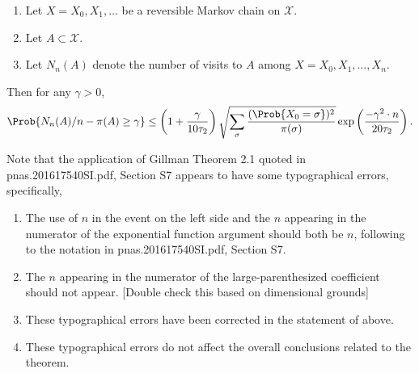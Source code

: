 \documentclass[12pt]{article}
\begin{document}
\begin{theorem}%
    \label{thm:significance:gillman}
    \begin{enumerate}
        \item
            Let \( X = X_0, X_1, \dots \) be a reversible Markov chain
            on \( \mathcal{X} \).
        \item
            Let \( A \subset \mathcal{X} \).
        \item
            Let \( N_n(A) \) denote the number of visits to \( A \)
            among \( X = X_0, X_1, \dots, X_n \).
    \end{enumerate}
    Then for any \( \gamma > 0 \),
    \[
        \Prob{N_n(A)/n - \pi(A) \ge \gamma} \le \left( 1 + \frac{\gamma}
        {10 \tau_2} \right) \sqrt{\sum_{\sigma} \frac{(\Prob{X_0 =
        \sigma})^2}{\pi (\sigma)}} \exp \left( \frac{-\gamma^2 \cdot n}{20
        \tau_2} \right).
    \]
\end{theorem}

\begin{remark}
    Note that the application of Gillman Theorem 2.1 quoted in
    pnas.201617540SI.pdf, Section S7 appears to have some typographical
    errors, specifically,
    \begin{enumerate}
        \item
            The use of \( n \) in the event on the left side and the \(
            n \) appearing in the numerator of the exponential function
            argument should both be \( n \), following to the notation
            in pnas.201617540SI.pdf, Section S7.
        \item
            The \( n \) appearing in the numerator of the
            large-parenthesized coefficient should not appear. [Double
            check this based on dimensional grounds]
        \item
            These typographical errors have been corrected in the
            statement of above.
        \item
            These typographical errors do not affect the overall
            conclusions related to the theorem.
    \end{enumerate}
\end{remark}
\end{document}

